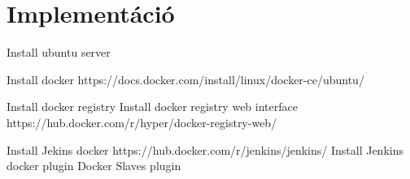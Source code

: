 \chapter{Implementáció}
\label{chapImplemetacio}

Install ubuntu server

Install docker
https://docs.docker.com/install/linux/docker-ce/ubuntu/

Install docker registry
Install docker registry web interface
https://hub.docker.com/r/hyper/docker-registry-web/

Install Jekins docker
https://hub.docker.com/r/jenkins/jenkins/
Install Jenkins docker plugin
Docker Slaves plugin
